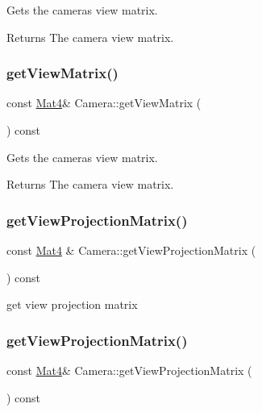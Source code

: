 Gets the camera\textquotesingle{}s view matrix.

\begin{DoxyReturn}{Returns}
The camera view matrix. 
\end{DoxyReturn}
\mbox{\label{classCamera_a72ba7f33c43ae0f1e907292befb8fa3b}} 
\subsubsection{\texorpdfstring{get\+View\+Matrix()}{getViewMatrix()}\hspace{0.1cm}{\footnotesize\ttfamily [2/2]}}
{\footnotesize\ttfamily const \hyperlink{classMat4}{Mat4}\& Camera\+::get\+View\+Matrix (\begin{DoxyParamCaption}{ }\end{DoxyParamCaption}) const}

Gets the camera\textquotesingle{}s view matrix.

\begin{DoxyReturn}{Returns}
The camera view matrix. 
\end{DoxyReturn}
\mbox{\label{classCamera_ab7251654fac905a8a8d2b902a81d17e6}} 
\subsubsection{\texorpdfstring{get\+View\+Projection\+Matrix()}{getViewProjectionMatrix()}\hspace{0.1cm}{\footnotesize\ttfamily [1/2]}}
{\footnotesize\ttfamily const \hyperlink{classMat4}{Mat4} \& Camera\+::get\+View\+Projection\+Matrix (\begin{DoxyParamCaption}{ }\end{DoxyParamCaption}) const}

get view projection matrix \mbox{\label{classCamera_a04b8c6249119046519ddd62b283928b6}} 
\subsubsection{\texorpdfstring{get\+View\+Projection\+Matrix()}{getViewProjectionMatrix()}\hspace{0.1cm}{\footnotesize\ttfamily [2/2]}}
{\footnotesize\ttfamily const \hyperlink{classMat4}{Mat4}\& Camera\+::get\+View\+Projection\+Matrix (\begin{DoxyParamCaption}{ }\end{DoxyParamCaption}) const}

